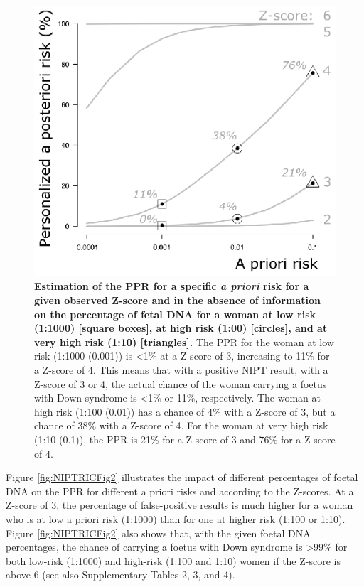\begin{figure}
	\includegraphics[width=1.0\linewidth]{img/NIPTRIC_Fig1}
	\caption[PPR at low and high risk]{\textbf{Estimation of the PPR for a specific \textsl{a priori} risk for a given observed Z-score and in the absence of information on the percentage of fetal DNA for a woman at low risk (1:1000) [square boxes], at high risk (1:00) [circles], and at very high risk (1:10) [triangles].} The PPR for the woman at low risk (1:1000 (0.001)) is \textless1\% at a Z-score of 3, increasing to 11\% for a Z-score of 4. This means that with a positive NIPT result, with a Z-score of 3 or 4, the actual chance of the woman carrying a foetus with Down syndrome is \textless1\% or 11\%, respectively. The woman at high risk (1:100 (0.01)) has a chance of 4\% with a Z-score of 3, but a chance of 38\% with a Z-score of 4. For the woman at very high risk (1:10 (0.1)), the PPR is 21\% for a Z-score of 3 and 76\% for a Z-score of 4.}
	\label{fig:NIPTRIC_Fig1}
\end{figure}

Figure \ref{fig:NIPTRICFig2} illustrates the impact of different percentages of foetal DNA on the PPR for different a priori risks and according to the Z-scores. At a Z-score of 3, the percentage of false-positive results is much higher for a woman who is at low a priori risk (1:1000) than for one at higher risk (1:100 or 1:10). Figure \ref{fig:NIPTRICFig2} also shows that, with the given foetal DNA percentages, the chance of carrying a foetus with Down syndrome is \textgreater99\% for both low-risk (1:1000) and high-risk (1:100 and 1:10) women if the Z-score is above 6 (see also Supplementary Tables 2, 3, and 4).

